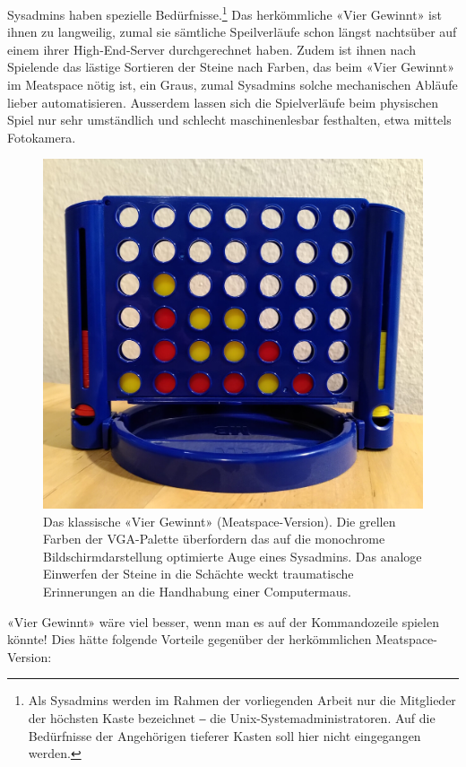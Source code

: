 \documentclass[a4paper,11pt,hidelinks]{scrartcl}
\begin{document}
Sysadmins haben spezielle Bedürfnisse.\footnote{Als Sysadmins werden im Rahmen der vorliegenden Arbeit nur die Mitglieder der höchsten Kaste bezeichnet ‒ die Unix-Systemadministratoren. Auf die Bedürfnisse der Angehörigen tieferer Kasten soll hier nicht eingegangen werden.} Das herkömmliche «Vier Gewinnt» ist ihnen zu langweilig, zumal sie sämtliche Speilverläufe schon längst nachtsüber auf einem ihrer High-End-Server durchgerechnet haben. Zudem ist ihnen nach Spielende das lästige Sortieren der Steine nach Farben, das beim «Vier Gewinnt» im Meatspace nötig ist, ein Graus, zumal Sysadmins solche mechanischen Abläufe lieber automatisieren. Ausserdem lassen sich die Spielverläufe beim physischen Spiel nur sehr umständlich und schlecht maschinenlesbar festhalten, etwa mittels Fotokamera.

\begin{figure}
    \centering
    \includegraphics[width=1.0\linewidth]{pics/vier-gewinnt.jpg}
    \caption{Das klassische «Vier Gewinnt» (Meatspace-Version). Die grellen Farben der VGA-Palette überfordern das auf die monochrome Bildschirmdarstellung optimierte Auge eines Sysadmins. Das analoge Einwerfen der Steine in die Schächte weckt traumatische Erinnerungen an die Handhabung einer Computermaus.}
    \label{fig:vier-gewinnt}
\end{figure}

«Vier Gewinnt» wäre viel besser, wenn man es auf der Kommandozeile spielen könnte! Dies hätte folgende Vorteile gegenüber der herkömmlichen Meatspace-Version:
\end{document}
